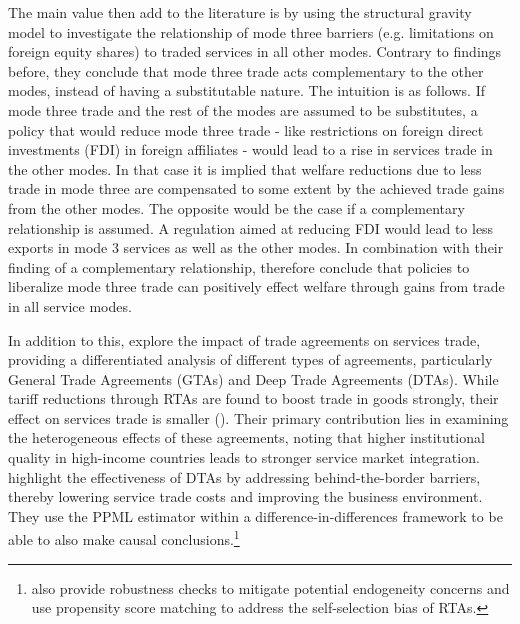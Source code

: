 The main value \textcite{intangible_2023} then add to the literature is by using the structural gravity model to investigate the relationship of mode three barriers (e.g. limitations on foreign equity shares) to traded services in all other modes. Contrary to findings before, they conclude that mode three trade acts complementary to the other modes, instead of having a substitutable nature. The intuition is as follows. If mode three trade and the rest of the modes are assumed to be substitutes, a policy that would reduce mode three trade - like restrictions on foreign direct investments (FDI) in foreign affiliates - would lead to a rise in services trade in the other modes. In that case it is implied that welfare reductions due to less trade in mode three are compensated to some extent by the achieved trade gains from the other modes. The opposite would be the case if a complementary relationship is assumed. A regulation aimed at reducing FDI would lead to less exports in mode 3 services as well as the other modes. In combination with their finding of a complementary relationship, \textcite{intangible_2023} therefore conclude that policies to liberalize mode three trade can positively effect welfare through gains from trade in all service modes.

In addition to this, \textcite{trade_agreements_2024} explore the impact of trade agreements on services trade, providing a differentiated analysis of different types of agreements, particularly General Trade Agreements (GTAs) and Deep Trade Agreements (DTAs). While tariff reductions through RTAs are found to boost trade in goods strongly, their effect on services trade is smaller (\cite{trade_agreements_2024}). Their primary contribution lies in examining the heterogeneous effects of these agreements, noting that higher institutional quality in high-income countries leads to stronger service market integration. \textcite{trade_agreements_2024} highlight the effectiveness of DTAs by addressing behind-the-border barriers, thereby lowering service trade costs and improving the business environment. They use the PPML estimator within a difference-in-differences framework to be able to also make causal conclusions.\footnote{\textcite{trade_agreements_2024} also provide robustness checks to mitigate potential endogeneity concerns and use propensity score matching to address the self-selection bias of RTAs.}









